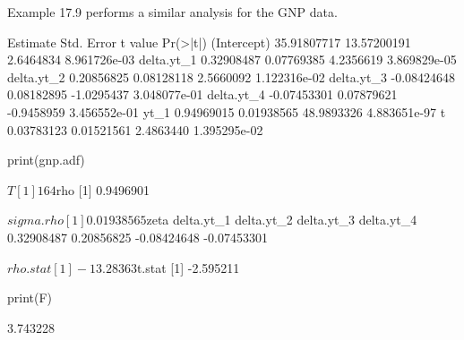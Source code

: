 \documentclass[a4paper]{article}
\renewcommand{\~}{\perispomeni}%
\begin{document}
Example 17.9 performs a similar analysis for the GNP data. 
\begin{Schunk}
\begin{Soutput}
               Estimate  Std. Error    t value     Pr(>|t|)
(Intercept) 35.91807717 13.57200191  2.6464834 8.961726e-03
delta.yt_1   0.32908487  0.07769385  4.2356619 3.869829e-05
delta.yt_2   0.20856825  0.08128118  2.5660092 1.122316e-02
delta.yt_3  -0.08424648  0.08182895 -1.0295437 3.048077e-01
delta.yt_4  -0.07453301  0.07879621 -0.9458959 3.456552e-01
yt_1         0.94969015  0.01938565 48.9893326 4.883651e-97
t            0.03783123  0.01521561  2.4863440 1.395295e-02
\end{Soutput}
\begin{Sinput}
 print(gnp.adf)
\end{Sinput}
\begin{Soutput}
$T
[1] 164

$rho
[1] 0.9496901

$sigma.rho
[1] 0.01938565

$zeta
 delta.yt_1  delta.yt_2  delta.yt_3  delta.yt_4 
 0.32908487  0.20856825 -0.08424648 -0.07453301 

$rho.stat
[1] -13.28363

$t.stat
[1] -2.595211
\end{Soutput}
\begin{Sinput}
 print(F)
\end{Sinput}
\begin{Soutput}
[1] 3.743228
\end{Soutput}
\end{Schunk}
\end{document}

